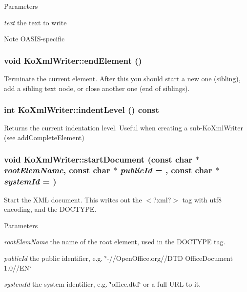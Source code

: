 \begin{DoxyParams}{Parameters}
\item[{\em text}]the text to write\end{DoxyParams}
\begin{DoxyNote}{Note}
OASIS-\/specific 
\end{DoxyNote}
\hypertarget{classKoXmlWriter_ac0c62332ed7c5011e8c8edd9c26019a0}{
\subsubsection[{endElement}]{\setlength{\rightskip}{0pt plus 5cm}void KoXmlWriter::endElement ()}}
\label{classKoXmlWriter_ac0c62332ed7c5011e8c8edd9c26019a0}
Terminate the current element. After this you should start a new one (sibling), add a sibling text node, or close another one (end of siblings). \hypertarget{classKoXmlWriter_a71173772ef00a18d725d861cd409c0ad}{
\subsubsection[{indentLevel}]{\setlength{\rightskip}{0pt plus 5cm}int KoXmlWriter::indentLevel () const}}
\label{classKoXmlWriter_a71173772ef00a18d725d861cd409c0ad}
\begin{DoxyReturn}{Returns}
the current indentation level. Useful when creating a sub-\/KoXmlWriter (see addCompleteElement) 
\end{DoxyReturn}
\hypertarget{classKoXmlWriter_a867932c8d3bbecd712572230cb0b64cd}{
\subsubsection[{startDocument}]{\setlength{\rightskip}{0pt plus 5cm}void KoXmlWriter::startDocument (const char $\ast$ {\em rootElemName}, \/  const char $\ast$ {\em publicId} = {}, \/  const char $\ast$ {\em systemId} = {})}}
\label{classKoXmlWriter_a867932c8d3bbecd712572230cb0b64cd}
Start the XML document. This writes out the $<$?xml?$>$ tag with utf8 encoding, and the DOCTYPE. 
\begin{DoxyParams}{Parameters}
\item[{\em rootElemName}]the name of the root element, used in the DOCTYPE tag. \item[{\em publicId}]the public identifier, e.g. \char`\"{}-\///OpenOffice.org//DTD OfficeDocument 1.0//EN\char`\"{} \item[{\em systemId}]the system identifier, e.g. \char`\"{}office.dtd\char`\"{} or a full URL to it. \end{DoxyParams}
